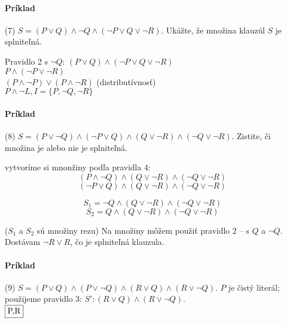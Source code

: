 \paragraph{Príklad} (7) $S=(P \lor Q) \land \neg Q \land ( \neg P \lor Q \lor \neg
R)$. Ukážte, že množina klauzúl $S$ je splniteľná.
\par Pravidlo 2 s $\neg Q$: $(P \lor Q) \land ( \neg P \lor Q \lor \neg R)$ \\
$P \land (\neg P \lor \neg R)$ \\
$(P \land \neg P) \lor (P \land \neg R)$ (distributívnosť) \\
$P \land \neg L, I=\{P,\neg Q, \neg R\}$

\paragraph{Príklad} (8) $S=(P\lor \neg Q) \land (\neg P \lor Q) \land (Q \lor
\neg R) \land (\neg Q \lor \neg R)$. Zistite, či množina je alebo nie je
splniteľná.
\par vytvoríme si mnonžiny podľa pravidla 4: \\
$$(P\land \neg Q) \land (Q \lor \neg R)  \land (\neg Q \lor \neg R)$$
$$(\neg P \lor Q) \land (Q \lor \neg R) \land (\neg Q \lor \neg R)$$

\par
$$S_1 = \neg Q \land (Q \lor \neg R) \land (\neg Q \lor \neg R)$$
$$S_2 = Q \land (Q \lor \neg R) \land (\neg Q \lor \neg R)$$

($S_1$ a $S_2$ sú množiny rezu)
Na množiny môžem použiť pravidlo 2 -- s $Q$ a $\neg Q$. Dostávam $\neg R \lor
R$, čo je splniteľná klauzula.

\paragraph{Príklad} (9) $S=(P \lor Q) \land (P \lor \neg Q) \land (R \lor Q)
\land (R \lor \neg Q)$. $P$ je čistý literál; použijeme pravidlo 3:
$S': (R \lor Q) \land (R \lor \neg Q)$. \\
$\fbox{P,R}$ \\
